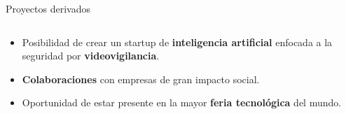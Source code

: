 \begin{frame}{Proyectos derivados}
\begin{columns}
\end{columns}

\begin{itemize}
    \justifying
    \item Posibilidad de crear un startup de \textbf{inteligencia artificial} enfocada a la seguridad por \textbf{videovigilancia}.
    \item \textbf{Colaboraciones} con empresas de gran impacto social.
    \item Oportunidad de estar presente en la mayor \textbf{feria tecnológica} del mundo.
\end{itemize}

\end{frame}
